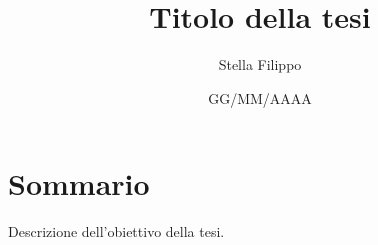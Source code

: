 \documentclass[12pt,a4paper,twoside,openright]{extreport}
\title{Titolo della tesi}
\author{Stella Filippo}
\date{GG/MM/AAAA}
\begin{document}
    \pagestyle{empty} %

    
    \cleardoublepage
    
    
    \cleardoublepage

    \pagestyle{plain} %

    \chapter*{Sommario}
    Descrizione dell'obiettivo della tesi.
    \cleardoublepage

    \tableofcontents
    \cleardoublepage
    
    \listoffigures
    \cleardoublepage %
    

    
    \cleardoublepage

    \printbibliography[heading=bibintoc]
\end{document}
